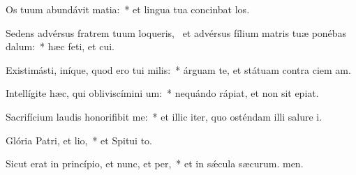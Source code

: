 \item Os tuum abundávit matia:~* et lingua tua concinbat los.
\item Sedens advérsus fratrem tuum loqueris,~\pscross{} et advérsus fílium matris tuæ ponébas dalum:~* hæc feti, et cui.
\item Existimásti, iníque, quod ero tui milis:~* árguam te, et státuam contra ciem am.
\item Intellígite hæc, qui obliviscímini um:~* nequándo rápiat, et non sit  epiat.
\item Sacrifícium laudis honorifibit me:~* et illic iter, quo osténdam illi salure i.
\item Glória Patri, et lio,~* et Spitui to.
\item Sicut erat in princípio, et nunc, et per,~* et in sǽcula sæcurum. men.
